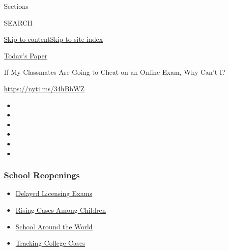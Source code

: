 Sections

SEARCH

\protect\hyperlink{site-content}{Skip to
content}\protect\hyperlink{site-index}{Skip to site index}

\href{https://myaccount.nytimes3xbfgragh.onion/auth/login?response_type=cookie\&client_id=vi}{}

\href{https://www.nytimes3xbfgragh.onion/section/todayspaper}{Today's
Paper}

If My Classmates Are Going to Cheat on an Online Exam, Why Can't I?

\url{https://nyti.ms/34hBbWZ}

\begin{itemize}
\item
\item
\item
\item
\item
\item
\end{itemize}

\hypertarget{school-reopenings}{%
\subsubsection{\texorpdfstring{\href{https://www.nytimes3xbfgragh.onion/spotlight/schools-reopening?name=styln-coronavirus-schools-reopening\&region=TOP_BANNER\&block=storyline_menu_recirc\&action=click\&pgtype=Article\&impression_id=769bf890-f1d6-11ea-940c-23fcdfc65706\&variant=undefined}{School
Reopenings}}{School Reopenings}}\label{school-reopenings}}

\begin{itemize}
\tightlist
\item
  \href{https://www.nytimes3xbfgragh.onion/2020/09/04/us/bar-exam-coronavirus.html?name=styln-coronavirus-schools-reopening\&region=TOP_BANNER\&block=storyline_menu_recirc\&action=click\&pgtype=Article\&impression_id=769bf891-f1d6-11ea-940c-23fcdfc65706\&variant=undefined}{Delayed
  Licensing Exams}
\item
  \href{https://www.nytimes3xbfgragh.onion/interactive/2020/08/31/us/coronavirus-cases-children.html?name=styln-coronavirus-schools-reopening\&region=TOP_BANNER\&block=storyline_menu_recirc\&action=click\&pgtype=Article\&impression_id=769bf892-f1d6-11ea-940c-23fcdfc65706\&variant=undefined}{Rising
  Cases Among Children}
\item
  \href{https://www.nytimes3xbfgragh.onion/2020/09/01/world/schools-reopen-globe-students.html?name=styln-coronavirus-schools-reopening\&region=TOP_BANNER\&block=storyline_menu_recirc\&action=click\&pgtype=Article\&impression_id=769bf893-f1d6-11ea-940c-23fcdfc65706\&variant=undefined}{School
  Around the World}
\item
  \href{https://www.nytimes3xbfgragh.onion/interactive/2020/us/covid-college-cases-tracker.html?name=styln-coronavirus-schools-reopening\&region=TOP_BANNER\&block=storyline_menu_recirc\&action=click\&pgtype=Article\&impression_id=769c1fa0-f1d6-11ea-940c-23fcdfc65706\&variant=undefined}{Tracking
  College Cases}
\end{itemize}


